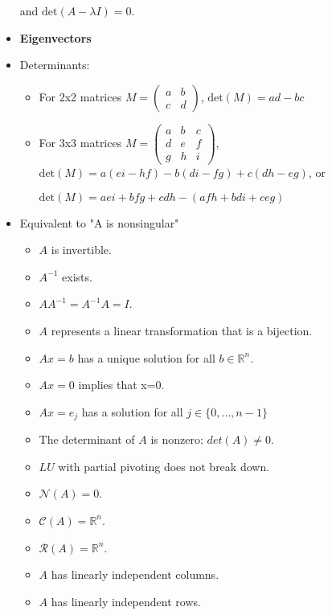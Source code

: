 \documentclass[a4paper]{article}
\begin{document}
\begin{itemize}
            and \( \text{det}(A-\lambda I)=0\).
        \item \textbf{Eigenvectors}
        \item Determinants:
            \begin{itemize}
                \item For 2x2 matrices 
                    \(M =
                    \begin{pmatrix}
                        a & b \\
                        c & d
                    \end{pmatrix}\),
                    \(\text{det}(M)=ad-bc \)
                \item For 3x3 matrices 
                    \(M =
                    \begin{pmatrix}
                        a & b & c \\
                        d & e & f \\
                        g & h & i
                    \end{pmatrix}\),
                    \(\text{det}(M)= a(ei-hf)-b(di-fg)+c(dh-eg) \), or
                    
                    \(\text{det}(M)= aei+bfg+cdh-(afh+bdi+ceg) \)
            \end{itemize}
        \item Equivalent to "A is nonsingular"
            \begin{itemize}
                \item \(A\) is invertible.
                \item \(A^{-1}\) exists.
                \item \(AA^{-1}=A^{-1}A=I\).
                \item \(A\) represents a linear transformation that is a bijection.
                \item \(Ax=b\) has a unique solution for all \(b\in \mathbb{R} ^n\).
                \item \(Ax=0\) implies that x=0.
                \item \(Ax=e_j\) has a solution for all \(j\in \{0,\dots ,n-1\}\)
                \item The determinant of \(A\) is nonzero: \(det(A)\neq 0\).
                \item \(LU\) with partial pivoting does not break down.
                \item \(\mathcal{N}(A)={0}\).
                \item \(\mathcal{C}(A)=\mathbb{R}^n\).
                \item \(\mathcal{R}(A)=\mathbb{R}^n\).
                \item \(A\) has linearly independent columns.
                \item \(A\) has linearly independent rows.
            \end{itemize}
    \end{itemize}
\end{document}

